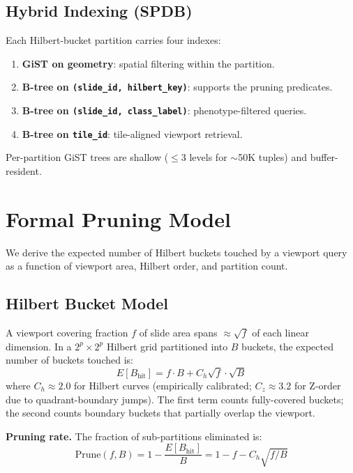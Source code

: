 \documentclass[10pt,twocolumn]{article}
\begin{document}
\subsection{Hybrid Indexing (SPDB)}

Each Hilbert-bucket partition carries four indexes:
\begin{enumerate}
\item \textbf{GiST on geometry}: spatial filtering within the partition.
\item \textbf{B-tree on \texttt{(slide\_id, hilbert\_key)}}: supports the pruning predicates.
\item \textbf{B-tree on \texttt{(slide\_id, class\_label)}}: phenotype-filtered queries.
\item \textbf{B-tree on \texttt{tile\_id}}: tile-aligned viewport retrieval.
\end{enumerate}

Per-partition GiST trees are shallow ($\le$3 levels for $\sim$50K tuples) and buffer-resident.

\section{Formal Pruning Model}
\label{sec:pruning_model}

We derive the expected number of Hilbert buckets touched by a viewport query as a function of viewport area, Hilbert order, and partition count.

\subsection{Hilbert Bucket Model}

A viewport covering fraction $f$ of slide area spans $\approx\!\sqrt{f}$ of each linear dimension.
In a $2^p \times 2^p$ Hilbert grid partitioned into $B$ buckets, the expected number of buckets touched is:
\begin{equation}
E[B_{\text{hit}}] = f \cdot B + C_h \sqrt{f} \cdot \sqrt{B}
\label{eq:buckets}
\end{equation}
where $C_h \approx 2.0$ for Hilbert curves (empirically calibrated; $C_z \approx 3.2$ for Z-order due to quadrant-boundary jumps).
The first term counts fully-covered buckets; the second counts boundary buckets that partially overlap the viewport.

\textbf{Pruning rate.} The fraction of sub-partitions eliminated is:
\begin{equation}
\text{Prune}(f, B) = 1 - \frac{E[B_{\text{hit}}]}{B} = 1 - f - C_h \sqrt{f / B}
\end{equation}
\end{document}
